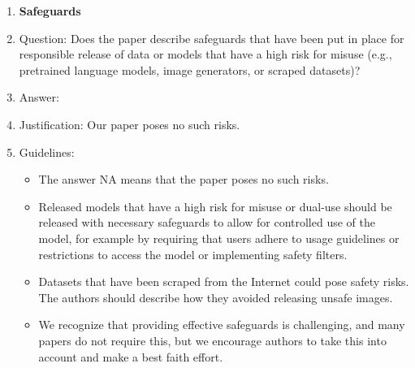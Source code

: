 \documentclass{article}
\theoremstyle{plain}
\begin{document}
\begin{enumerate}
\item {\bf Safeguards}
    \item[] Question: Does the paper describe safeguards that have been put in place for responsible release of data or models that have a high risk for misuse (e.g., pretrained language models, image generators, or scraped datasets)?
    \item[] Answer: \answerNA{} %
    \item[] Justification: Our paper poses no such risks.
    \item[] Guidelines:
    \begin{itemize}
        \item The answer NA means that the paper poses no such risks.
        \item Released models that have a high risk for misuse or dual-use should be released with necessary safeguards to allow for controlled use of the model, for example by requiring that users adhere to usage guidelines or restrictions to access the model or implementing safety filters. 
        \item Datasets that have been scraped from the Internet could pose safety risks. The authors should describe how they avoided releasing unsafe images.
        \item We recognize that providing effective safeguards is challenging, and many papers do not require this, but we encourage authors to take this into account and make a best faith effort.
    \end{itemize}


\end{enumerate}
\end{document}
